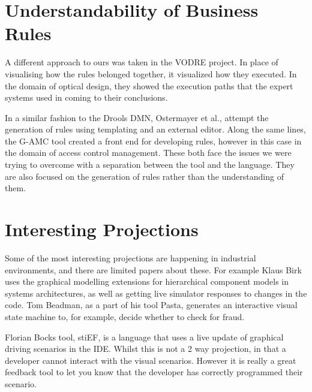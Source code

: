 \section{Understandability of Business Rules}

A different approach to ours was taken in the VODRE project\cite{lapaev2014vodre}.
In place of visualising how the rules belonged together, it visualized how they executed.
In the domain of optical design, they showed the execution paths that the expert systems used in coming to their conclusions.

In a similar fashion to the Drools DMN, Ostermayer et al.\cite{ostermayer2013simplifying}, attempt the generation of rules using templating and an external editor.
Along the same lines, the G-AMC tool\cite{sa2016g} created a front end for developing rules, however in this case in the domain of access control management.
These both face the issues we were trying to overcome with a separation between the tool and the language. 
They are also focused on the generation of rules rather than the understanding of them.

\section{Interesting Projections}
Some of the most interesting projections are happening in industrial environments, and there are limited papers about these.
For example Klaus Birk\cite{Birken_Interactive} uses the graphical modelling extensions for hierarchical component models in systems architectures, as well as getting live simulator responses to changes in the code.
Tom Beadman\cite{Beadman_Journey}, as a part of his tool Pasta, generates an interactive visual state machine to, for example, decide whether to check for fraud. 

Florian Bocks tool, stiEF\cite{Bock_stief}, is a language that uses a live update of graphical driving scenarios in the IDE.
Whilst this is not a 2 way projection, in that a developer cannot interact with the visual scenarios.
However it is really a great feedback tool to let you know that the developer has correctly programmed their scenario. 